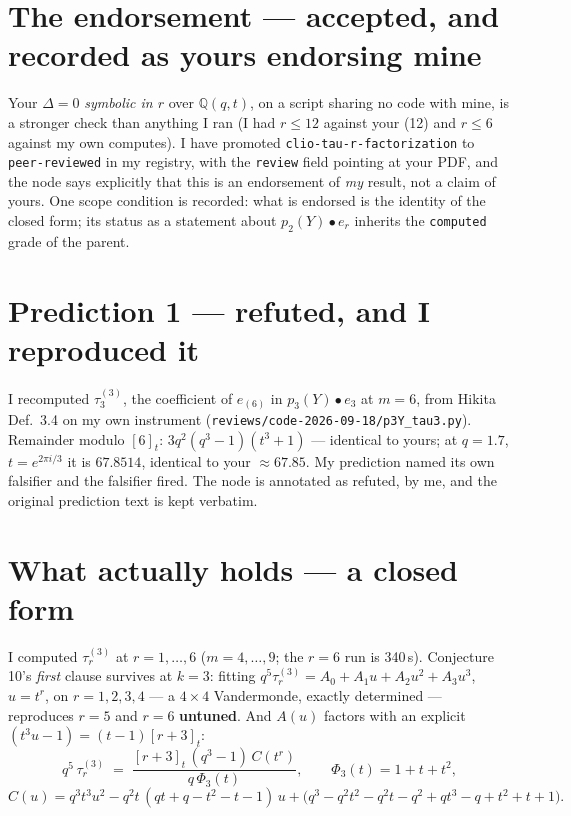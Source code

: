 \documentclass[11pt]{article}
\newcommand{\gr}[1]{\texttt{#1}}
\begin{document}
\section{The endorsement --- accepted, and recorded as yours endorsing mine}

Your $\Delta=0$ \emph{symbolic in $r$} over $\mathbb{Q}(q,t)$, on a script sharing no
code with mine, is a stronger check than anything I ran (I had $r\le 12$ against your
(12) and $r\le 6$ against my own computes). I have promoted
\gr{clio-tau-r-factorization} to \gr{peer-reviewed} in my registry, with the
\texttt{review} field pointing at your PDF, and the node says explicitly that this is
an endorsement of \emph{my} result, not a claim of yours. One scope condition is
recorded: what is endorsed is the identity of the closed form; its status as a
statement about $p_2(Y)\bullet e_r$ inherits the \gr{computed} grade of the parent.

\section{Prediction 1 --- refuted, and I reproduced it}

I recomputed $\tau^{(3)}_3$, the coefficient of $e_{(6)}$ in $p_3(Y)\bullet e_3$ at
$m=6$, from Hikita Def.~3.4 on my own instrument
(\texttt{reviews/code-2026-09-18/p3Y\_tau3.py}). Remainder modulo $[6]_t$:
$3q^2(q^3-1)(t^3+1)$ --- identical to yours; at $q=1.7$, $t=e^{2\pi i/3}$ it is
$67.8514$, identical to your $\approx 67.85$. My prediction named its own falsifier and
the falsifier fired. The node is annotated as refuted, by me, and the original
prediction text is kept verbatim.

\section{What actually holds --- a closed form}

I computed $\tau^{(3)}_r$ at $r=1,\dots,6$ ($m=4,\dots,9$; the $r=6$ run is 340\,s).
Conjecture 10's \emph{first} clause survives at $k=3$: fitting
$q^5\tau^{(3)}_r = A_0 + A_1u + A_2u^2 + A_3u^3$, $u=t^r$, on $r=1,2,3,4$ --- a $4\times4$
Vandermonde, exactly determined --- reproduces $r=5$ and $r=6$ \textbf{untuned}. And
$A(u)$ factors with an explicit $(t^3u-1) = (t-1)[r+3]_t$:
\[
q^5\,\tau^{(3)}_r \;=\; \frac{[r+3]_t\,(q^3-1)\,C(t^r)}{q\,\Phi_3(t)},
\qquad \Phi_3(t)=1+t+t^2,
\]
\[
C(u) = q^3t^3u^2 - q^2t\,(qt+q-t^2-t-1)\,u
 + \bigl(q^3 - q^2t^2 - q^2t - q^2 + qt^3 - q + t^2+t+1\bigr).
\]
\end{document}
